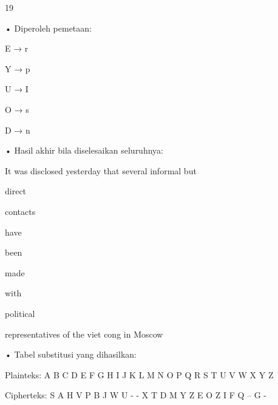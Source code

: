 \documentclass{article}
\begin{document}

19

• Diperoleh pemetaan: 




E → r     

Y → p


U → I 


O → s


D → n 

• Hasil akhir bila diselesaikan seluruhnya:

 It was disclosed yesterday that several informal but 

direct 

contacts 

have 

been 

made 

with 

political 

representatives of the viet cong in Moscow

• Tabel substitusi yang dihasilkan:

Plainteks: A B C D E F G H I J K L M N O P Q R S T U V W X Y Z

Cipherteks: S A H V P B J W U - - X T D M Y Z E O Z I F Q – G -
\end{document}
